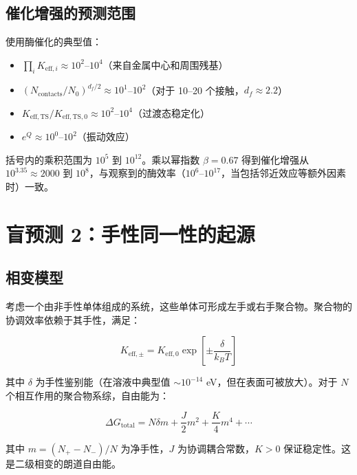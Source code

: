 \documentclass[11pt,a4paper]{article}
\newcommand{\df}{d_{\!f}}
\begin{document}
	\subsection{催化增强的预测范围}
	
	使用酶催化的典型值：
	\begin{itemize}
		\item \(\prod_i K_{\mathrm{eff},i} \approx 10^2\)–\(10^4\)（来自金属中心和周围残基）
		\item \((N_{\text{contacts}}/N_0)^{\df/2} \approx 10^1\)–\(10^2\)（对于 10–20 个接触，\(\df \approx 2.2\)）
		\item \(K_{\mathrm{eff},\text{TS}}/K_{\mathrm{eff},\text{TS},0} \approx 10^2\)–\(10^4\)（过渡态稳定化）
		\item \(e^{Q} \approx 10^0\)–\(10^2\)（振动效应）
	\end{itemize}
	
	括号内的乘积范围为 \(10^5\) 到 \(10^{12}\)。乘以幂指数 \(\beta = 0.67\) 得到催化增强从 \(10^{3.35} \approx 2000\) 到 \(10^{8}\)，与观察到的酶效率（\(10^6\)–\(10^{17}\)，当包括邻近效应等额外因素时）一致。
	
	\section{盲预测 2：手性同一性的起源}
	\label{sec:chirality}
	
	\subsection{相变模型}
	
	考虑一个由非手性单体组成的系统，这些单体可形成左手或右手聚合物。聚合物的协调效率依赖于其手性，满足：
	
	\begin{equation}
		K_{\mathrm{eff},\pm} = K_{\mathrm{eff},0} \exp\left[\pm \frac{\delta}{k_B T}\right]
		\label{eq:keff-chiral}
	\end{equation}
	
	其中 \(\delta\) 为手性鉴别能（在溶液中典型值 \(\sim 10^{-14}\) eV，但在表面可被放大）。对于 \(N\) 个相互作用的聚合物系综，自由能为：
	
	\begin{equation}
		\Delta G_{\text{total}} = N \delta m + \frac{J}{2} m^2 + \frac{K}{4} m^4 + \cdots
		\label{eq:chiral-free}
	\end{equation}
	
	其中 \(m = (N_+ - N_-)/N\) 为净手性，\(J\) 为协调耦合常数，\(K > 0\) 保证稳定性。这是二级相变的朗道自由能。
	
\end{document}
